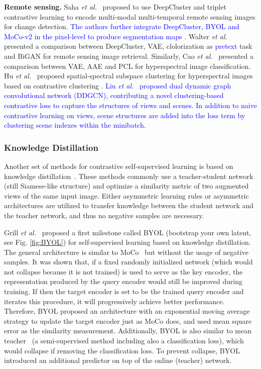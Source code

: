 \documentclass[lettersize,journal]{IEEEtran}
\newcommand{\etal}{\textit{et al.}}
\begin{document}
\textbf{Remote sensing.} Saha \etal~\cite{saha2021self} proposed to use DeepCluster and triplet contrastive learning to encode multi-modal multi-temporal remote sensing images for change detection. 
\textcolor{blue}{The authors further integrate DeepCluster, BYOL and MoCo-v2 in the pixel-level to  produce segmentation maps \cite{saha2022unsupervised}.} 
Walter \etal~\cite{walter2020self} presented a comparison between DeepCluster, VAE, clolorization as \textcolor{blue}{pretext} task and BiGAN for remote sensing image retrieval. Similarly, Cao \etal~\cite{cao2021contrastnet} presented a comparison between VAE, AAE and PCL for hyperspectral image classification. Hu \etal~\cite{hu2021deep} proposed  spatial-spectral subspace clustering for hyperspectral images based on contrastive clustering \cite{li2021contrastive}. \textcolor{blue}{Liu \etal~\cite{liu2022contrastive} proposed  dual dynamic graph convolutional network (DDGCN), contributing a novel clustering-based contrastive loss to capture the structures of views and scenes. In addition to naive contrastive learning on views, scene structures are added into the loss term by clustering scene indexes within the minibatch.}


\subsubsection{Knowledge Distillation}

Another set of methods for contrastive self-supervised learning is based on knowledge distillation~\cite{hinton2015distilling}. These methods commonly use a teacher-student network (still Siamese-like structure) and optimize a similarity metric of two augmented views of the same input image. Either asymmetric learning rules or asymmetric architectures are utilized to transfer knowledge between the student network and the teacher network, and thus no negative samples are necessary. 



Grill \etal~\cite{grill2020bootstrap} proposed a first milestone called BYOL (bootstrap your own latent, see Fig. \ref{fig:BYOL}) for self-supervised learning based on knowledge distillation. The general architecture is similar to MoCo~\cite{he2020momentum} but without the usage of negative samples. It was shown that, if a fixed randomly initialized network (which would not collapse because it is not trained) is used to serve as the key encoder, the representation produced by the query encoder would still be improved during training. If then the target encoder is set to be the trained query encoder and iterates this procedure, it will progressively achieve better performance. Therefore, BYOL proposed an architecture with an exponential moving average strategy to update the target encoder just as MoCo does, and used mean square error as the similarity measurement. Additionally, BYOL is also similar to mean teacher~\cite{tarvainen2017mean} (a semi-supervised method including also a classification loss), which would collapse if removing the classification loss. To prevent collapse, BYOL introduced an additional predictor on top of the online (teacher) network.
\end{document}

